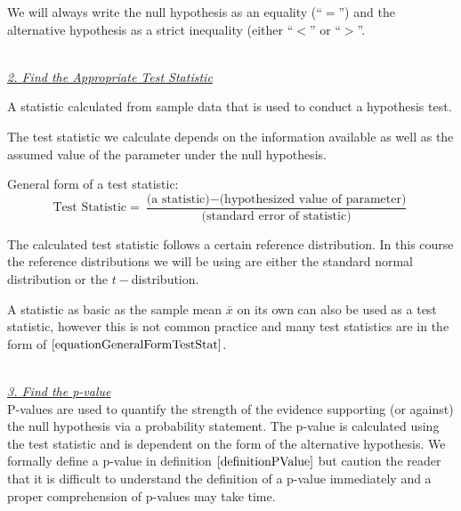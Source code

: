 \begin{nt}
We will always write the null hypothesis as an equality (``$=$'')
and the alternative hypothesis as a strict inequality (either ``$<$'' or ``$>$''.
\end{nt}


\hfill\\


\noindent
{\em \underline{2. Find the Appropriate Test Statistic} }\\

\begin{definition}	
A statistic calculated from sample data that is used to conduct a hypothesis test.
\end{definition}

\noindent
The test statistic we calculate depends on the information available as well as the assumed value of the parameter under the null hypothesis.

\begin{skeleton}
General form of a test statistic:
	\begin{equation}\label{equationGeneralFormTestStat}
	\text{Test Statistic} = \frac{ \text{(a statistic)} -  \text{(hypothesized value of parameter)} }{ \text{(standard error of statistic)} }
	\end{equation}
\end{skeleton}

The calculated test statistic follows a certain reference distribution. In this course the reference distributions we will be using are either the standard normal distribution or the $t-$distribution.

\begin{nt}
A statistic as basic as the sample mean $\bar{x}$ on its own 
can also be used as a test statistic, 
however this is not common practice and many test statistics 
are in the form of $\ref{equationGeneralFormTestStat}$.
\end{nt}


\hfill\\
\noindent
{\em \underline{3. Find the p-value} }\\

\noindent
P-values are used to quantify the strength of the evidence supporting 
(or against) the null hypothesis via a probability statement. The p-value is calculated using the test statistic and is dependent on the form of the alternative hypothesis. We formally define a p-value in definition $\ref{definitionPValue}$ but caution the reader that it is difficult to understand the definition of a p-value immediately and a proper comprehension of p-values may take time.

